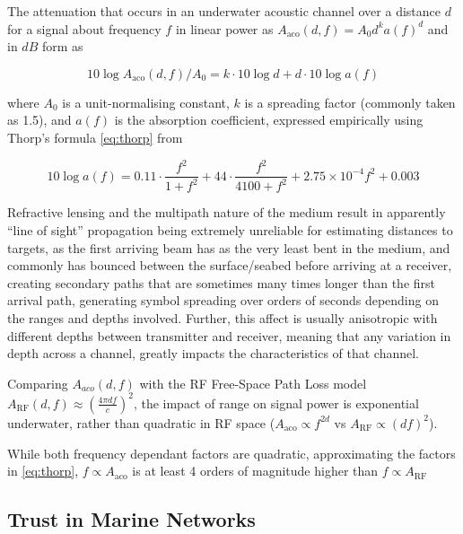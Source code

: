 \documentclass[runningheads,a4paper]{llncs}
\begin{document}
The attenuation that occurs in an underwater acoustic channel over a distance $d$ for a signal about frequency $f$ in linear power as $A_{\text{aco}}(d,f) = A_0d^ka(f)^d$ and in $dB$ form as

\begin{equation}
  \label{eq:acoattenuationdb}
  10 \log A_{\text{aco}}(d,f)/A_0 = k \cdot 10 \log d + d \cdot 10 \log a(f)
\end{equation}

where $A_0$ is a unit-normalising constant, $k$ is a spreading factor (commonly taken as 1.5), and $a(f)$ is the absorption coefficient, expressed empirically using Thorp's formula \eqref{eq:thorp} from \cite{Stojanovic2007}

\begin{equation}
  \label{eq:thorp}
  10 \log a(f) = 0.11 \cdot \frac{f^2}{1+f^2} + 44\cdot\frac{f^2}{4100+f^2}+ 2.75\times10^{-4} f^2 + 0.003
\end{equation}

Refractive lensing and the multipath nature of the medium result in apparently ``line of sight'' propagation being extremely unreliable for estimating distances to targets, as the first arriving beam has as the very least bent in the medium, and commonly has bounced between the surface/seabed before arriving at a receiver, creating secondary paths that are sometimes many times longer than the first arrival path, generating symbol spreading over orders of seconds depending on the ranges and depths involved.
Further, this affect is usually anisotropic with different depths between transmitter and receiver, meaning that any variation in depth across a channel, greatly impacts the characteristics of that channel.

Comparing $A_{aco}(d,f)$ with the RF Free-Space Path Loss model $A_{\text{RF}}(d,f) \approx \left( \frac{4\pi d f}{c} \right)^2$, the impact of range on signal power is exponential underwater, rather than quadratic in RF space ($A_{\text{aco}} \propto f^{2d}$ vs $A_{\text{RF}} \propto (df)^2$).
  
While both frequency dependant factors are quadratic, approximating the factors in \eqref{eq:thorp}, $f\propto A_{\text{aco}}$ is at least 4 orders of magnitude higher than $f\propto A_{\text{RF}}$


\subsection{Trust in Marine Networks}
\end{document}
